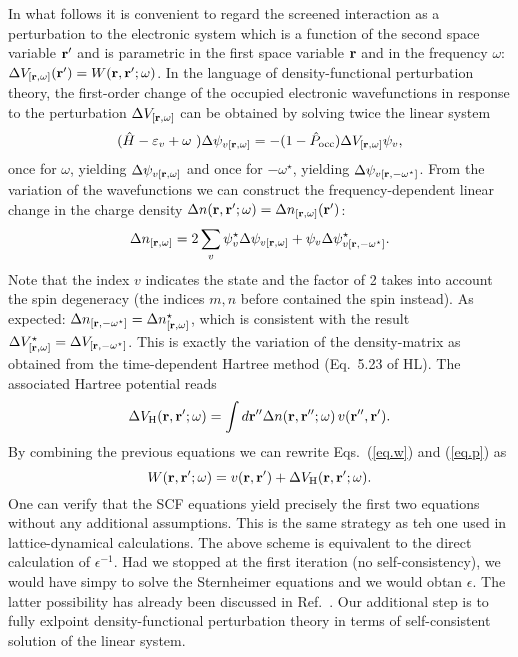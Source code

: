 \documentclass[twocolumn,prb,showpacs,superscriptaddress]{revtex4}
\def\w{\omega}
\def\H{\hat{H}}
\def\P{\hat{P}_{\rm occ}}
\def\E{\varepsilon}
\def\r{{\bf r}}
\def\rp{{\bf r^\prime}}
\def\rpp{{\bf r^{\prime\prime}}}
\begin{document}
In what follows it is convenient to regard the screened interaction
as a perturbation to the electronic system which is a function of the 
second space variable $\rp$ and is parametric in the first space variable 
$\r$ and in the frequency $\w$: $\Delta V_{[\r,\w]}(\rp) = W(\r,\rp;\w)$.
In the language of density-functional perturbation theory, the first-order
change of the occupied electronic wavefunctions in response to the perturbation
$\Delta V_{[\r,\w]}$ can be obtained by solving twice the linear system
  \begin{equation}\label{eq.linsys}
  (\H-\E_v+\w\,\,) \Delta \psi_{v[\r,\w]}  =  -(1-\P)  \Delta V_{[\r,\w]} \psi_v,
  \end{equation}
once for $\w$, yielding $\Delta \psi_{v[\r,\w]}$ and once for $-\w^\star$,
yielding $\Delta \psi_{v[\r,-\w^\star]}$.
%
%
From the variation of the wavefunctions we can construct the frequency-dependent
linear change in the charge density $\Delta n(\r,\rp;\w)=\Delta n_{[\r,\w]}(\rp)$:
  \begin{equation}
  \Delta n_{[\r,\w]} = 2\sum_v \psi_v^\star \Delta \psi_{v[\r,\w]} +
      \psi_v \Delta \psi^\star_{v[\r,-\w^\star]} .
  \end{equation}
Note that the index $v$ indicates the state and the factor of 2 takes into
account the spin degeneracy (the indices $m,n$ before contained the spin instead).
As expected: $\Delta n_{[\r,-\w^\star]}=\Delta n^\star_{[\r,\w]}$, which
is consistent with the result $\Delta V_{[\r,\w]}^\star = \Delta V_{[\r,-\w^\star]}$.\cite{note.w.even}
This is exactly the variation of the density-matrix 
as obtained from the time-dependent Hartree method (Eq.\ 5.23 of HL).
The associated Hartree potential reads
  \begin{equation}
    \Delta V_{\rm H}(\r,\rp;\w) = \int d\rpp \Delta n(\r,\rpp;\w) \, v(\rpp,\rp).
  \end{equation}
By combining the previous equations we can rewrite Eqs.\ (\ref{eq.w}) and (\ref{eq.p}) as
  \begin{equation}
  W(\r,\rp;\w) = v(\r,\rp) + \Delta V_{\rm H}(\r,\rp;\w).
  \end{equation}
One can verify that the SCF equations yield precisely the first two equations
without any additional assumptions. This is the same strategy as teh one used
in lattice-dynamical calculations.
The above scheme is equivalent to the direct calculation of $\epsilon^{-1}$.
Had we stopped at the first iteration (no self-consistency), we would have
simpy to solve the Sternheimer equations and we would obtan $\epsilon$.
The latter possibility has already been discussed in Ref.\ .
Our additional step is to fully exlpoint density-functional perturbation theory
in terms of self-consistent solution of the linear system.
\end{document}
